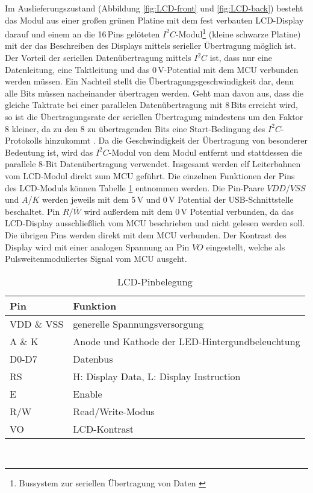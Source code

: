 Im Auslieferungszustand (Abbildung \ref{fig:LCD-front} und \ref{fig:LCD-back}) besteht das Modul aus einer großen grünen Platine mit dem fest verbauten LCD-Display darauf und einem an die 16\,Pins gelöteten $I^2C$-Modul\footnote{Bussystem zur seriellen Übertragung von Daten \cite[S. 61]{MCU_in_Practice}} (kleine schwarze Platine) mit der das Beschreiben des Displays mittels serieller Übertragung möglich ist. Der Vorteil der seriellen Datenübertragung mittels $I^2C$ ist, dass nur eine Datenleitung, eine Taktleitung und das 0\,V-Potential mit dem MCU verbunden werden müssen. Ein Nachteil stellt die Übertragungsgeschwindigkeit dar, denn alle Bits müssen nacheinander übertragen werden. Geht man davon aus, dass die gleiche Taktrate bei einer parallelen Datenübertragung mit 8\,Bits erreicht wird, so ist die Übertragungsrate der seriellen Übertragung mindestens um den Faktor 8 kleiner, da zu den 8 zu übertragenden Bits eine Start-Bedingung des $I^2C$-Protokolls hinzukommt \cite[S. 62]{MCU_in_Practice}. Da die Geschwindigkeit der Übertragung von besonderer Bedeutung ist, wird das $I^2C$-Modul von dem Modul entfernt und stattdessen die parallele 8-Bit Datenübertragung verwendet. Insgesamt werden elf Leiterbahnen vom LCD-Modul direkt zum MCU geführt. Die einzelnen Funktionen der Pins des LCD-Moduls können Tabelle \ref{tab:LCD_Pins} entnommen werden. Die Pin-Paare $VDD$/$VSS$ und $A$/$K$ werden jeweils mit dem 5\,V und 0\,V Potential der USB-Schnittstelle beschaltet. Pin $R/\overline{W}$ wird außerdem mit dem 0\,V Potential verbunden, da das LCD-Display ausschließlich vom MCU beschrieben und nicht gelesen werden soll. Die übrigen Pins werden direkt mit dem MCU verbunden. Der Kontrast des Display wird mit einer analogen Spannung an Pin $VO$ eingestellt, welche als Pulsweitenmoduliertes Signal vom MCU ausgeht.
\begin{table}[h]
	\begin{center}
		\caption{LCD-Pinbelegung \cite[s. 7]{LCD_MN}}
		\begin{tabular}{l | l}
			\textbf{Pin} & \textbf{Funktion}\\
			\hline
			VDD \& VSS & generelle Spannungsversorgung\\
			A \& K & Anode und Kathode der LED-Hintergundbeleuchtung\\
			D0-D7 & Datenbus\\
			RS & H: Display Data, L: Display Instruction\\
			E & Enable\\
			R/W & Read/Write-Modus\\
			VO & LCD-Kontrast\\
		\end{tabular}
	\label{tab:LCD_Pins}
	\end{center}
\end{table}\\
